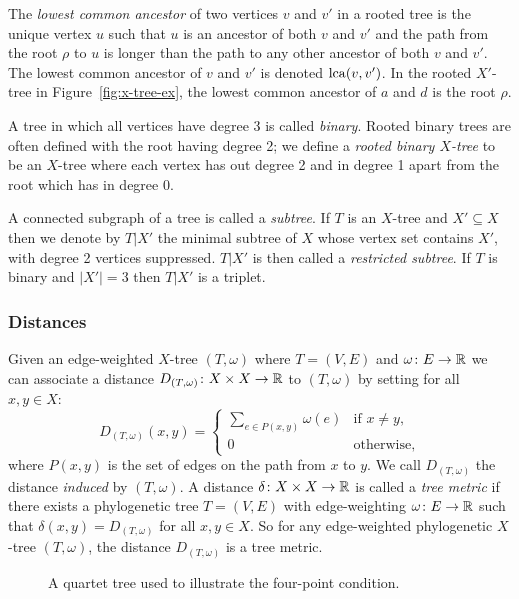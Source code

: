 The \textit{lowest common ancestor} of two vertices $v$ and $v'$ in a rooted
tree is the unique vertex $u$ such that $u$ is an ancestor of both $v$ and
$v'$ and the path from the root $\rho$ to $u$ is longer than the path to any
other ancestor of both $v$ and $v'$.  The lowest common ancestor of $v$ and
$v'$ is denoted $\operatorname{lca}(v,v')$.  In the rooted $X'$-tree in
Figure~\ref{fig:x-tree-ex}, the lowest common ancestor of $a$ and $d$ is the
root $\rho$.

A tree in which all vertices have degree 3 is called \textit{binary}.  Rooted
binary trees are often defined with the root having degree 2; we define a
\textit{rooted binary $X$-tree} to be an $X$-tree where each vertex has out
degree 2 and in degree 1 apart from the root which has in degree 0.

A connected subgraph of a tree is called a \textit{subtree}.  If $T$ is an
$X$-tree and $X' \subseteq X$ then we denote by $T|X'$ the minimal subtree of
$X$ whose vertex set contains $X'$, with degree 2 vertices suppressed.  $T|X'$
is then called a \textit{restricted subtree}.  If $T$ is binary and $|X'| = 3$
then $T|X'$ is a triplet.

\subsubsection{Distances}
\label{sec:distances}

Given an edge-weighted $X$-tree $(T,\omega)$ where $T=(V,E)$ and $\omega
\colon E \to {\mathbb R}$ we can associate a distance $D_{(T,\omega)} \colon X \times
X \to {\mathbb R}$ to $(T,\omega)$ by setting for all $x,y \in X$:
\begin{equation*}
  D_{(T,\omega)}(x,y) =
  \begin{cases}
    \displaystyle
    \sum_{e \in P(x,y)} \omega(e) & \text{if $x \neq y$},\\
    0 & \text{otherwise,}
  \end{cases}
\end{equation*}
where $P(x,y)$ is the set of edges on the path from $x$ to $y$.  We call
$D_{(T,\omega)}$ the distance \textit{induced} by $(T,\omega)$.  A distance
$\delta \colon X \times X \to {\mathbb R}$ is called a \textit{tree metric} if there
exists a phylogenetic tree $T=(V,E)$ with edge-weighting $\omega \colon E \to
{\mathbb R}$ such that $\delta(x,y) = D_{(T,\omega)}$ for all $x,y \in X$.  So for any
edge-weighted phylogenetic $X$-tree $(T,\omega)$, the distance
$D_{(T,\omega)}$ is a tree metric.

\begin{figure}
  \centering
  
  \caption{A quartet tree used to illustrate the four-point condition.}
  \label{fig:quartet-tree}
\end{figure}

